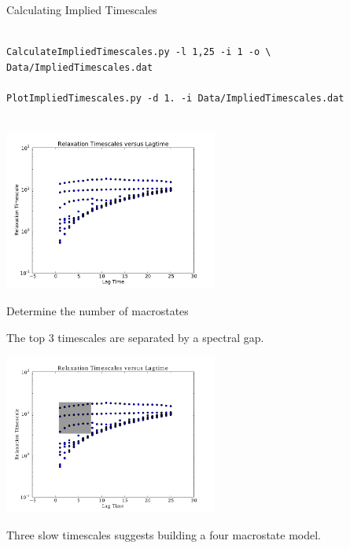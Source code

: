 \documentclass[10pt]{beamer}
\begin{document}
\begin{frame}[fragile]{Calculating Implied Timescales}

\begin{verbatim}

CalculateImpliedTimescales.py -l 1,25 -i 1 -o \
Data/ImpliedTimescales.dat

PlotImpliedTimescales.py -d 1. -i Data/ImpliedTimescales.dat


\end{verbatim}

\includegraphics[width=7.0cm]{Figures/microstate_timescales.pdf}

\end{frame}

\begin{frame}{Determine the number of macrostates}
  
 The top 3 timescales are separated by a spectral gap.
 
 \vfill
 
 \includegraphics[width=7.0cm]{Figures/microstate_timescales-gap.pdf}

 \vfill
 
 Three slow timescales suggests building a four macrostate model.
 
\end{frame}
\end{document}
